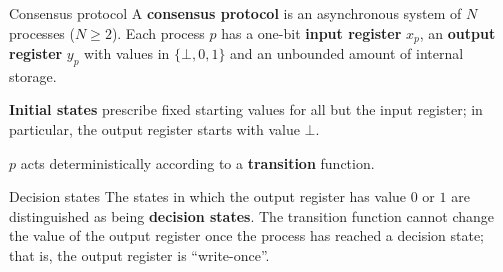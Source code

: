 \documentclass[12pt]{beamer}
\begin{document}
  \begin{frame}{Consensus protocol}
    A \textbf{consensus protocol} is an asynchronous system of \(N\) processes (\(N\ge 2\)). Each process \(p\) has a one-bit \textbf{input register} \(x_p\), an \textbf{output register} \(y_p\) with values in \(\{\bot, 0, 1\}\) and an unbounded amount of internal storage.

    \vspace{0.25cm}

    \textbf{Initial states} prescribe fixed starting values for all but the input register; in particular, the output register starts with value \(\bot\).

    \vspace{0.25cm}

    \(p\) acts deterministically according to a \textbf{transition} function.
  \end{frame}

  \begin{frame}{Decision states}
    The states in which the output register has value \(0\) or \(1\) are distinguished as being \textbf{decision states}. The transition function cannot change the value of the output register once the process has reached a decision state; that is, the output register is ``write-once''.

    \vspace{0.25cm}

    \begin{figure}
    \end{figure}
  \end{frame}
\end{document}
